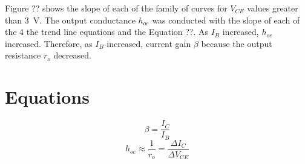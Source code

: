 Figure ?? shows the slope of each of the family of curves  for $V_{CE}$ values greater than \SI{3}{V}.  The output conductance $h_{oe}$ was conducted with the slope of each of the 4 the trend line equations and the Equation ??.  As $I_B$ increased, $h_{oe}$ increased.   Therefore, as $I_B$ increased, current gain $\beta$ because the output resistance $r_o$ decreased.

\section{Equations}

%
\begin{equation}
  \label{eq:beta}
  \beta = \frac{I_C}{I_B}
\end{equation}
%
\begin{equation}
  \label{eq:hoe}
  h_{oe} \approx \frac{1}{r_o} = \frac{\Delta I_C}{\Delta V_{CE}}
\end{equation}
%


